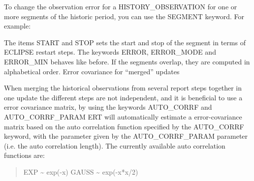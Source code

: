 \documentclass[letterpaper,10pt,english]{sphinxmanual}
\begin{document}
To change the observation error for a HISTORY\_OBSERVATION for one or
more segments of the historic period, you can use the SEGMENT
keyword. For example:

%
\begin{sphinxVerbatim}[commandchars=\\\{\}]
 
           
      
       

    
        
         
        
        

    
             
              
            
        
\end{sphinxVerbatim}

The items START and STOP sets the start and stop of the segment in
terms of ECLIPSE restart steps. The keywords ERROR, ERROR\_MODE and
ERROR\_MIN behaves like before. If the segments overlap, they are
computed in alphabetical order.  Error covariance for “merged” updates

When merging the historical observations from several report steps
together in one update the different steps are not independent, and it
is beneficial to use a error covariance matrix, by using the keywords
AUTO\_CORRF and AUTO\_CORRF\_PARAM ERT will automatically estimate a
error-covariance matrix based on the auto correlation function
specified by the AUTO\_CORRF keyword, with the parameter given by the
AUTO\_CORRF\_PARAM parameter (i.e. the auto correlation length). The
currently available auto correlation functions are:
\begin{quote}

EXP   \textasciitilde{} exp(-x)
GAUSS \textasciitilde{} exp(-x*x/2)
\end{quote}
\end{document}
